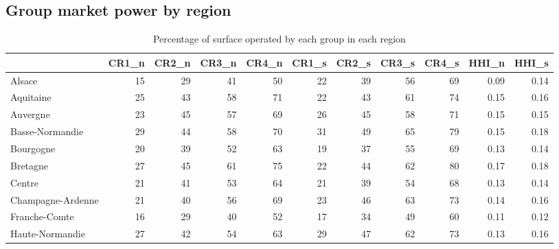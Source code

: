 \documentclass[11pt]{article}
\begin{document}
\subsection{Group market power by region}

\begin{table}[H]
\caption{Percentage of surface operated by each group in each region}
\footnotesize
\setlength{\tabcolsep}{2pt}

\begin{tabular}{lrrrrrrrrrr}
\toprule
\toprule
{} &      CR1\_n &      CR2\_n &      CR3\_n &      CR4\_n &      CR1\_s &      CR2\_s &      CR3\_s &      CR4\_s &      HHI\_n &      HHI\_s \\
\midrule
Alsace               &         15 &         29 &         41 &         50 &         22 &         39 &         56 &         69 &       0.09 &       0.14 \\
Aquitaine            &         25 &         43 &         58 &         71 &         22 &         43 &         61 &         74 &       0.15 &       0.16 \\
Auvergne             &         23 &         45 &         57 &         69 &         26 &         45 &         58 &         71 &       0.15 &       0.15 \\
Basse-Normandie      &         29 &         44 &         58 &         70 &         31 &         49 &         65 &         79 &       0.15 &       0.18 \\
Bourgogne            &         20 &         39 &         52 &         63 &         19 &         37 &         55 &         69 &       0.13 &       0.14 \\
Bretagne             &         27 &         45 &         61 &         75 &         22 &         44 &         62 &         80 &       0.17 &       0.18 \\
Centre               &         21 &         41 &         53 &         64 &         21 &         39 &         54 &         68 &       0.13 &       0.14 \\
Champagne-Ardenne    &         21 &         40 &         56 &         69 &         23 &         46 &         63 &         73 &       0.14 &       0.16 \\
Franche-Comte        &         16 &         29 &         40 &         52 &         17 &         34 &         49 &         60 &       0.11 &       0.12 \\
Haute-Normandie      &         27 &         42 &         54 &         63 &         29 &         47 &         62 &         73 &       0.13 &       0.16 \\

\end{tabular}
\end{table}
\end{document}
